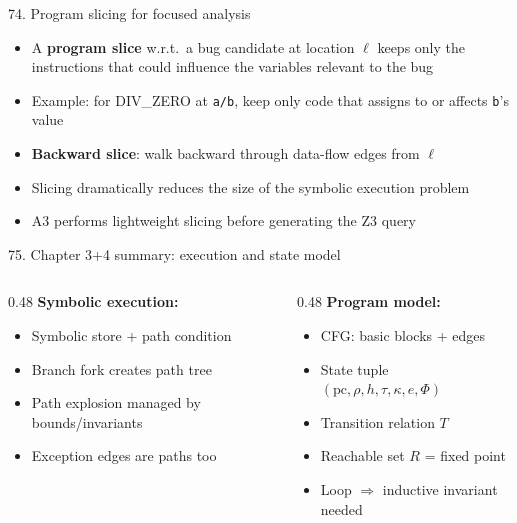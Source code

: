 \documentclass[aspectratio=169]{beamer}
\begin{document}
\begin{frame}{74. Program slicing for focused analysis}
\begin{itemize}
  \item A \textbf{program slice} w.r.t.\ a bug candidate at location \(\ell\) keeps only the instructions
    that could influence the variables relevant to the bug
  \item Example: for DIV\_ZERO at \texttt{a/b}, keep only code that assigns to or affects \texttt{b}'s value
  \item \textbf{Backward slice}: walk backward through data-flow edges from \(\ell\)
  \item Slicing dramatically reduces the size of the symbolic execution problem
  \item A3 performs lightweight slicing before generating the Z3 query
\end{itemize}
\end{frame}

\begin{frame}{75. Chapter 3+4 summary: execution and state model}
\begin{columns}
\begin{column}{0.48\textwidth}
\textbf{Symbolic execution:}
\begin{itemize}
  \item Symbolic store + path condition
  \item Branch fork creates path tree
  \item Path explosion managed by bounds/invariants
  \item Exception edges are paths too
\end{itemize}
\end{column}
\begin{column}{0.48\textwidth}
\textbf{Program model:}
\begin{itemize}
  \item CFG: basic blocks + edges
  \item State tuple $(\text{pc}, \rho, h, \tau, \kappa, e, \Phi)$
  \item Transition relation $T$
  \item Reachable set $R$ = fixed point
  \item Loop $\Rightarrow$ inductive invariant needed
\end{itemize}
\end{column}
\end{columns}
\end{frame}

\end{document}
